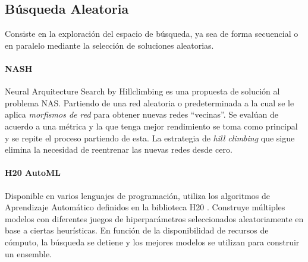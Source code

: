 \subsection{B\'usqueda Aleatoria}
Consiste en la exploraci\'on del espacio de b\'usqueda, ya sea de forma secuencial o en paralelo mediante la selecci\'on de soluciones aleatorias. %

        \paragraph{NASH } Neural Arquitecture Search by Hillclimbing es una propuesta de soluci\'on al problema NAS.
Partiendo de una red aleatoria o predeterminada a la cual se le aplica \textit{morfismos de red} para obtener  nuevas redes ``vecinas''. Se eval\'uan de acuerdo a una  m\'etrica y la que tenga mejor rendimiento se toma como principal y se repite el proceso partiendo de esta. La estrategia de \textit{hill climbing} que sigue elimina la necesidad de reentrenar las nuevas redes desde cero.

        \paragraph{H20 AutoML } Disponible en varios lenguajes de programaci\'on, utiliza los algoritmos de Aprendizaje Autom\'atico definidos en la biblioteca H20 . Construye m\'ultiples modelos con diferentes juegos de hiperpar\'ametros seleccionados aleatoriamente en base a ciertas heur\'isticas. En funci\'on de la disponibilidad de recursos de c\'omputo, la b\'usqueda se detiene y los mejores modelos se utilizan para construir un ensemble.


